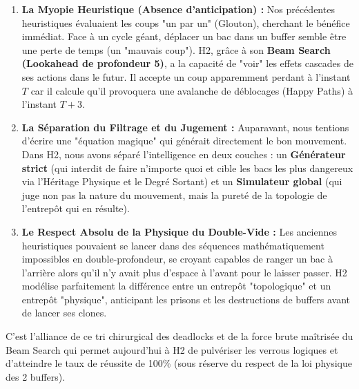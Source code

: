 \documentclass[11pt,a4paper]{article}
\begin{document}
\begin{enumerate}
    \item \textbf{La Myopie Heuristique (Absence d'anticipation) :}
    Nos précédentes heuristiques évaluaient les coups "un par un" (Glouton), cherchant le bénéfice immédiat. Face à un cycle géant, déplacer un bac dans un buffer semble être une perte de temps (un "mauvais coup"). H2, grâce à son \textbf{Beam Search (Lookahead de profondeur 5)}, a la capacité de "voir" les effets cascades de ses actions dans le futur. Il accepte un coup apparemment perdant à l'instant $T$ car il calcule qu'il provoquera une avalanche de déblocages (Happy Paths) à l'instant $T+3$.
    
    \item \textbf{La Séparation du Filtrage et du Jugement :}
    Auparavant, nous tentions d'écrire une "équation magique" qui générait directement le bon mouvement. Dans H2, nous avons séparé l'intelligence en deux couches : un \textbf{Générateur strict} (qui interdit de faire n'importe quoi et cible les bacs les plus dangereux via l'Héritage Physique et le Degré Sortant) et un \textbf{Simulateur global} (qui juge non pas la nature du mouvement, mais la pureté de la topologie de l'entrepôt qui en résulte).
    
    \item \textbf{Le Respect Absolu de la Physique du Double-Vide :}
    Les anciennes heuristiques pouvaient se lancer dans des séquences mathématiquement impossibles en double-profondeur, se croyant capables de ranger un bac à l'arrière alors qu'il n'y avait plus d'espace à l'avant pour le laisser passer. H2 modélise parfaitement la différence entre un entrepôt "topologique" et un entrepôt "physique", anticipant les prisons et les destructions de buffers avant de lancer ses clones.
\end{enumerate}

C'est l'alliance de ce tri chirurgical des deadlocks et de la force brute maîtrisée du Beam Search qui permet aujourd'hui à H2 de pulvériser les verrous logiques et d'atteindre le taux de réussite de 100\% (sous réserve du respect de la loi physique des 2 buffers).
\end{document}
